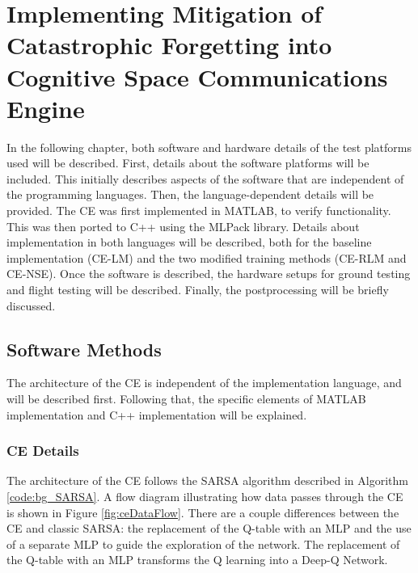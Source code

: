\chapter{Implementing Mitigation of Catastrophic Forgetting into Cognitive Space Communications Engine}\label{ch:methods}
\par In the following chapter, both software and hardware details of the test platforms used will be described. First, details about the software platforms will be included. This initially describes aspects of the software that are independent of the programming languages. Then, the language-dependent details will be provided. The CE was first implemented in MATLAB, to verify functionality. This was then ported to C++ using the MLPack library. Details about implementation in both languages will be described, both for the baseline implementation (CE-LM) and the two modified training methods (CE-RLM and CE-NSE). Once the software is described, the hardware setups for ground testing and flight testing will be described. Finally, the postprocessing will be briefly discussed.

\section{Software Methods}
\par The architecture of the CE is independent of the implementation language, and will be described first. Following that, the specific elements of MATLAB implementation and C++ implementation will be explained.
\subsection{CE Details}
\par The architecture of the CE follows the SARSA algorithm described in Algorithm \ref{code:bg_SARSA}. A flow diagram illustrating how data passes through the CE is shown in Figure \ref{fig:ceDataFlow}. There are a couple differences between the CE and classic SARSA: the replacement of the Q-table with an MLP and the use of a separate MLP to guide the exploration of the network. The replacement of the Q-table with an MLP transforms the Q learning into a Deep-Q Network.

